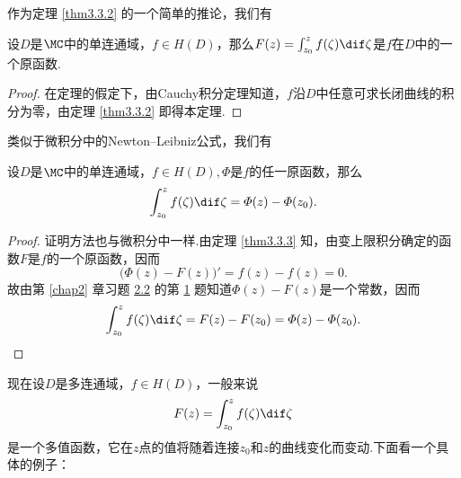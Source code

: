 作为定理 \ref{thm3.3.2} 的一个简单的推论，我们有
\begin{theorem}\label{thm3.3.3}
设$D$是$\MC$中的单连通域，$f\in H(D)$，那么$F(z)=\int_{z_0}^zf(\zeta)\dif \zeta$是$f$在$D$中的一个原函数.
\end{theorem}
\begin{proof}
在定理的假定下，由Cauchy积分定理知道，$f$沿$D$中任意可求长闭曲线的积分为零，由定理 \ref{thm3.3.2} 即得本定理.
\end{proof}

类似于微积分中的Newton--Leibniz公式，我们有
\begin{theorem}\label{thm3.3.4}
设$D$是$\MC$中的单连通域，$f\in H(D),\varPhi$是$f$的任一原函数，那么
\[\int_{z_0}^zf(\zeta)\dif \zeta=\varPhi(z)-\varPhi(z_0).\]
\end{theorem}
\begin{proof}
证明方法也与微积分中一样.由定理 \ref{thm3.3.3} 知，由变上限积分确定的函数$F$是$f$的一个原函数，因而
\[\big(\varPhi(z)-F(z)\big)'=f(z)-f(z)=0.\]
故由第 \ref{chap2} 章习题 \hyperlink{xiti2.2}{2.2} 的第 \hyperlink{xiti2.2.1}{1} 题知道$\varPhi(z)-F(z)$是一个常数，因而
\begin{equation*}
  \int_{z_0}^zf(\zeta)\dif \zeta=F(z)-F(z_0)=\varPhi(z)-\varPhi(z_0). \qedhere
\end{equation*} 
\end{proof}

现在设$D$是多连通域，$f\in H(D)$，一般来说
\[F(z)=\int_{z_0}^zf(\zeta)\dif \zeta\]
是一个多值函数，它在$z$点的值将随着连接$z_0$和$z$的曲线变化而变动.下面看一个具体的例子：

